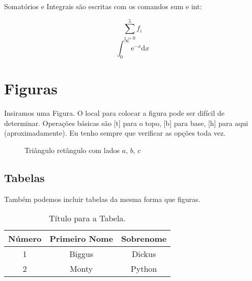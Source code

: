 \documentclass[12pt]{article}
\begin{document}
Somatórios e Integrais são escritas com os comandos sum e int:

\begin{equation} 
  \sum_{i=0}^{5} f_{i}
\end{equation} 
\begin{equation} 
  \int_{0}^{\infty} \mathrm{e}^{-x} \mathrm{d}x
\end{equation} 

\section{Figuras}

Insiramos uma Figura. O local para colocar a figura pode ser difícil de determinar.
Operações básicas são [t] para o topo, [b] para base, [h] para aqui (aproximadamente).
Eu tenho sempre que verificar as opções toda vez.

\begin{figure}[H] %
    \centering %
    \caption{Triângulo retângulo com lados $a$, $b$, $c$}
    \label{fig:right-triangle}
\end{figure}

\subsection{Tabelas}
Também podemos incluir tabelas da mesma forma que figuras.

\begin{table}[H]
  \caption{Título para a Tabela.}
  \begin{tabular}{c|cc} 
    Número &  Primeiro Nome & Sobrenome \\ %
    \hline %
    1 & Biggus & Dickus \\
    2 & Monty & Python
  \end{tabular}
\end{table}
\end{document}
